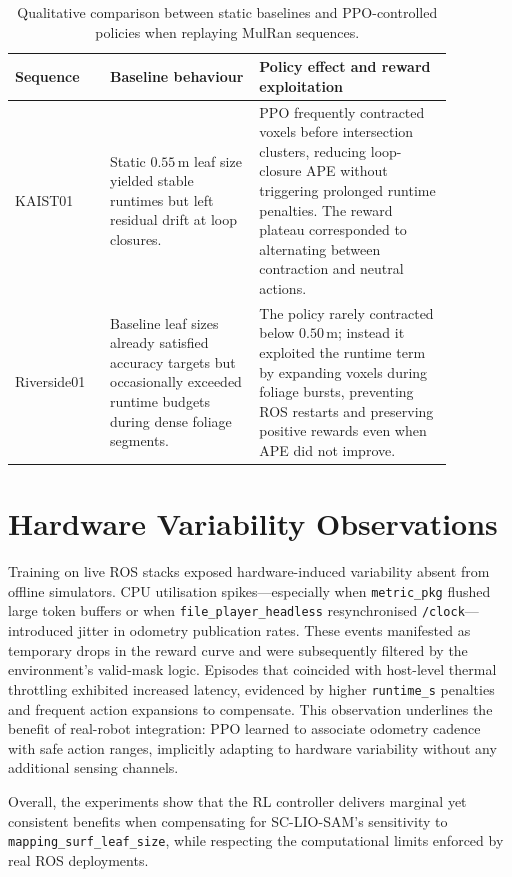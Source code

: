 \begin{table}[ht]
    \centering
    \renewcommand{\arraystretch}{1.2}
    \begin{tabular}{p{0.18\linewidth}p{0.30\linewidth}p{0.39\linewidth}}
        \toprule
        \textbf{Sequence} & \textbf{Baseline behaviour} & \textbf{Policy effect and reward exploitation} \\
        \midrule
        KAIST01 & Static $0.55$\,m leaf size yielded stable runtimes but left residual drift at loop closures. & PPO frequently contracted voxels before intersection clusters, reducing loop-closure APE without triggering prolonged runtime penalties. The reward plateau corresponded to alternating between contraction and neutral actions. \\
        Riverside01 & Baseline leaf sizes already satisfied accuracy targets but occasionally exceeded runtime budgets during dense foliage segments. & The policy rarely contracted below $0.50$\,m; instead it exploited the runtime term by expanding voxels during foliage bursts, preventing ROS restarts and preserving positive rewards even when APE did not improve. \\
        \bottomrule
    \end{tabular}
    \caption{Qualitative comparison between static baselines and PPO-controlled policies when replaying MulRan sequences.}
    \label{tab:rl_eval_summary}
\end{table}

\section{Hardware Variability Observations}
Training on live ROS stacks exposed hardware-induced variability absent from offline simulators. CPU utilisation spikes—especially when \texttt{metric\_pkg} flushed large token buffers or when \texttt{file\_player\_headless} resynchronised \texttt{/clock}—introduced jitter in odometry publication rates. These events manifested as temporary drops in the reward curve and were subsequently filtered by the environment's valid-mask logic. Episodes that coincided with host-level thermal throttling exhibited increased latency, evidenced by higher \texttt{runtime\_s} penalties and frequent action expansions to compensate. This observation underlines the benefit of real-robot integration: PPO learned to associate odometry cadence with safe action ranges, implicitly adapting to hardware variability without any additional sensing channels.

Overall, the experiments show that the RL controller delivers marginal yet consistent benefits when compensating for SC-LIO-SAM's sensitivity to \texttt{mapping\_surf\_leaf\_size}, while respecting the computational limits enforced by real ROS deployments.